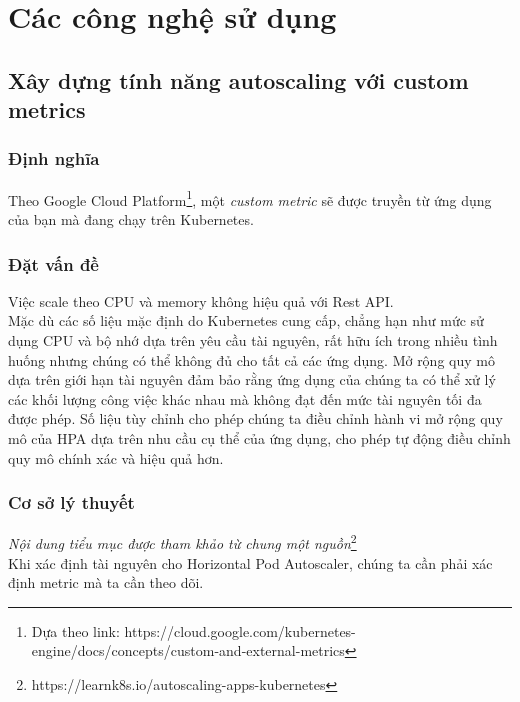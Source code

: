 \chapter{Các công nghệ sử dụng}
\section{Xây dựng tính năng autoscaling với custom metrics}

\subsection{Định nghĩa}
\noindent Theo Google Cloud Platform\footnote{Dựa theo link: https://cloud.google.com/kubernetes-engine/docs/concepts/custom-and-external-metrics}, một \textit{custom metric} sẽ được truyền từ ứng dụng của bạn mà đang chạy trên Kubernetes.
\subsection{Đặt vấn đề}
\noindent Việc scale theo CPU và memory không hiệu quả với Rest API.\\[0.5cm]
\noindent Mặc dù các số liệu mặc định do Kubernetes cung cấp, chẳng hạn như mức sử dụng CPU và bộ nhớ dựa trên yêu cầu tài nguyên, rất hữu ích trong nhiều tình huống nhưng chúng có thể không đủ cho tất cả các ứng dụng. Mở rộng quy mô dựa trên giới hạn tài nguyên đảm bảo rằng ứng dụng của chúng ta có thể xử lý các khối lượng công việc khác nhau mà không đạt đến mức tài nguyên tối đa được phép. Số liệu tùy chỉnh cho phép chúng ta điều chỉnh hành vi mở rộng quy mô của HPA dựa trên nhu cầu cụ thể của ứng dụng, cho phép tự động điều chỉnh quy mô chính xác và hiệu quả hơn.
\subsection{Cơ sở lý thuyết}
\textit{Nội dung tiểu mục được tham khảo từ chung một nguồn}\footnote{https://learnk8s.io/autoscaling-apps-kubernetes}\\[0.5cm]
Khi xác định tài nguyên cho Horizontal Pod Autoscaler, chúng ta cần phải xác định metric mà ta cần theo dõi.


